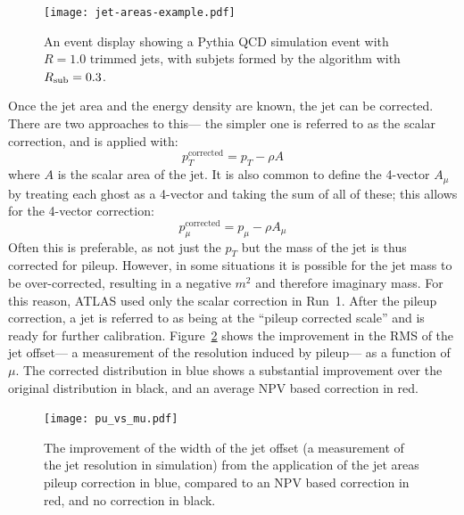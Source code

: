 
\begin{figure}
\centering
\texttt{[image: jet-areas-example.pdf]}
\caption{An event display showing a Pythia QCD simulation event with \antikt $R=1.0$ trimmed jets, with subjets formed by the \kt algorithm with $R_{\rm sub} = 0.3$.}
\label{fig:jet-reconstruction:jet-active-areas}
\end{figure}


Once the jet area and the energy density are known, the jet can be corrected. There are two approaches to this--- the simpler one is referred to as the scalar correction, and is applied with:
%
\begin{equation}
p_T^{\mathrm{corrected}} = p_T - \rho A
\end{equation}
%
where $A$ is the scalar area of the jet. It is also common to define the 4-vector $A_\mu$ by treating each ghost as a 4-vector and taking the sum of all of these; this allows for the 4-vector correction:
%
\begin{equation}
p_\mu^{\mathrm{corrected}} = p_\mu - \rho A_\mu
\end{equation}
%
Often this is preferable, as not just the $p_T$ but the mass of the jet is thus corrected for pileup. However, in some situations it is possible for the jet mass to be over-corrected, resulting in a negative $m^2$ and therefore imaginary mass. For this reason, ATLAS used only the scalar correction in Run~1. After the pileup correction, a jet is referred to as being at the ``pileup corrected scale'' and is ready for further calibration. Figure~\ref{fig:jet-reconstruction:jet-pu-vs-mu} shows the improvement in the RMS of the jet offset--- a measurement of the resolution induced by pileup--- as a function of $\mu$. The corrected distribution in blue shows a substantial improvement over the original distribution in black, and an average NPV based correction in red.


\begin{figure}
\centering
\texttt{[image: pu\_vs\_mu.pdf]}
\caption{The improvement of the width of the jet offset (a measurement of the jet resolution in simulation) from the application of the jet areas pileup correction in blue, compared to an NPV based correction in red, and no correction in black.}
\label{fig:jet-reconstruction:jet-pu-vs-mu}
\end{figure}


